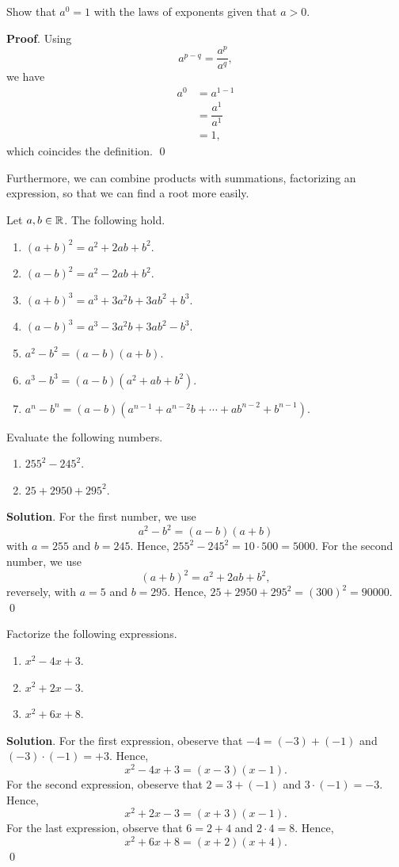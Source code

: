 \documentclass[11pt]{book}
\begin{document}
\begin{example}
    Show that $a^0=1$ with the laws of exponents given that $a>0$.
\end{example}
\textbf{Proof}. Using $$a^{p-q}=\dfrac{a^p}{a^q},$$ we have 
\begin{align*}
    a^0&=a^{1-1}\\
    &=\dfrac{a^1}{a^1}\\
    &=1,
\end{align*}
which coincides the definition. \qed

Furthermore, we can combine products with summations, factorizing an expression, so that we can find a root more easily.

\begin{theorem}[Factorization]
    Let $a, b\in\mathbb{R}$. The following hold.
    \begin{enumerate}
        \item $(a+b)^2=a^2+2ab+b^2$.
        \item $(a-b)^2=a^2-2ab+b^2$.
        \item $(a+b)^3=a^3+3a^2b+3ab^2+b^3$.
        \item $(a-b)^3=a^3-3a^2b+3ab^2-b^3$.
        \item $a^2-b^2=(a-b)(a+b)$.
        \item $a^3-b^3=(a-b)(a^2+ab+b^2)$.
        \item $a^n-b^n=(a-b)(a^{n-1}+a^{n-2}b+\cdots+ab^{n-2}+b^{n-1})$.
    \end{enumerate}
\end{theorem}

\begin{example}
    Evaluate the following numbers.
    \begin{enumerate}
        \item $255^2-245^2$.
        \item $25+2950+295^2$.
    \end{enumerate}
\end{example}
\textbf{Solution}. For the first number, we use $$a^2-b^2=(a-b)(a+b)$$ with $a=255$ and $b=245$. Hence, $255^2-245^2=10\cdot500=5000$. For the second number, we use $$(a+b)^2=a^2+2ab+b^2,$$ reversely, with $a=5$ and $b=295$. Hence, $25+2950+295^2=(300)^2=90000$. \qed

\begin{example}
    Factorize the following expressions.
    \begin{enumerate}
        \item $x^2-4x+3$.
        \item $x^2+2x-3$.
        \item $x^2+6x+8$.
    \end{enumerate}
\end{example}
\textbf{Solution}. For the first expression, obeserve that $-4=(-3)+(-1)$ and $(-3)\cdot(-1)=+3$. Hence, $$x^2-4x+3=(x-3)(x-1).$$ For the second expression, obeserve that $2=3+(-1)$ and $3\cdot(-1)=-3$. Hence, $$x^2+2x-3=(x+3)(x-1).$$ For the last expression, observe that $6=2+4$ and $2\cdot4=8$. Hence, $$x^2+6x+8=(x+2)(x+4).$$ \qed
\end{document}
